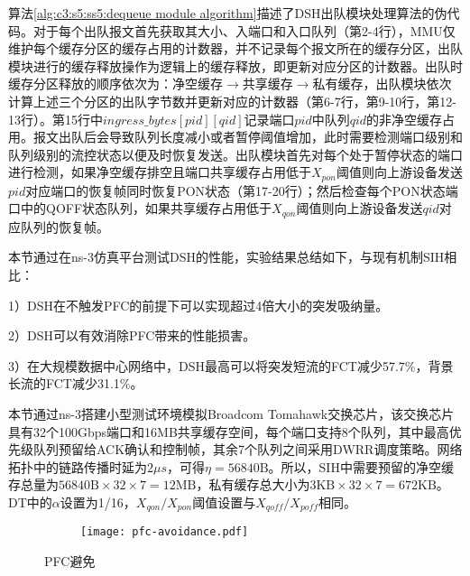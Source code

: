算法\ref{alg:c3:s5:ss5:dequeue module algorithm}描述了DSH出队模块处理算法的伪代码。对于每个出队报文首先获取其大小、入端口和入口队列（第2-4行），MMU仅维护每个缓存分区的缓存占用的计数器，并不记录每个报文所在的缓存分区，出队模块进行的缓存释放操作为逻辑上的缓存释放，即更新对应分区的计数器。出队时缓存分区释放的顺序依次为：净空缓存$\rightarrow$共享缓存$\rightarrow$私有缓存，出队模块依次计算上述三个分区的出队字节数并更新对应的计数器（第6-7行，第9-10行，第12-13行）。第15行中$ingress\_bytes[pid][qid]$记录端口$pid$中队列$qid$的非净空缓存占用。报文出队后会导致队列长度减小或者暂停阈值增加，此时需要检测端口级别和队列级别的流控状态以便及时恢复发送。出队模块首先对每个处于暂停状态的端口进行检测，如果净空缓存排空且端口共享缓存占用低于$X_{pon}$阈值则向上游设备发送$pid$对应端口的恢复帧同时恢复PON状态（第17-20行）；然后检查每个PON状态端口中的QOFF状态队列，如果共享缓存占用低于$X_{qon}$阈值则向上游设备发送$qid$对应队列的恢复帧。


\label{c3:s6:dsh evaluation}

本节通过在ns-3仿真平台\cite{ns-3}测试DSH的性能，实验结果总结如下，与现有机制SIH相比：

1）DSH在不触发PFC的前提下可以实现超过4倍大小的突发吸纳量。

2）DSH可以有效消除PFC带来的性能损害。

3）在大规模数据中心网络中，DSH最高可以将突发短流的FCT减少57.7\%，背景长流的FCT减少31.1\%。

\label{c3:s5:ss1:basic performance evaluation}

本节通过ns-3搭建小型测试环境模拟Broadcom Tomahawk交换芯片，该交换芯片具有32个100Gbps端口和16MB共享缓存空间，每个端口支持8个队列，其中最高优先级队列预留给ACK确认和控制帧，其余7个队列之间采用DWRR调度策略。网络拓扑中的链路传播时延为$2 \mu s$，可得$\eta=\text{56840B}$。所以，SIH中需要预留的净空缓存总量为$\text{56840B} \times 32 \times 7 = \text{12MB}$，私有缓存总大小为$\text{3KB} \times 32 \times 7 = \text{672KB}$。DT中的$\alpha$设置为1/16\cite{SIGCOMM16RDMA}，$X_{qon} / X_{pon}$阈值设置与$X_{qoff} / X_{poff}$相同。

\begin{figure}[H]
  \begin{subfigure}[b]{0.49\linewidth}
      \centering
      \resizebox{0.95\linewidth}{!}{}
      \label{c3:s6:ss1:fig:sub1:pfc avoidance scenario}
  \end{subfigure}
  \begin{subfigure}[b]{0.49\linewidth}
      \centering
      \texttt{[image: pfc-avoidance.pdf]}
      \label{c3:s6:ss1:fig:sub1:total pause duration}
  \end{subfigure}
  \caption{PFC避免}
  \label{c3:s6:ss1:fig:sub1:pfc avoidance}
\end{figure}

